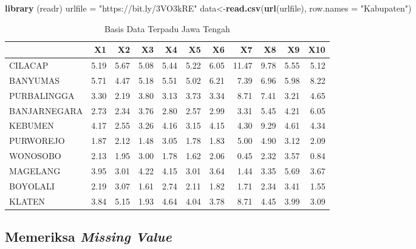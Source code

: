 \documentclass[
  oneside]{book}
\newenvironment{Shaded}{\begin{snugshade}}{\end{snugshade}}
\newcommand{\AttributeTok}[1]{\textcolor[rgb]{0.13,0.29,0.53}{#1}}
\newcommand{\FunctionTok}[1]{\textcolor[rgb]{0.13,0.29,0.53}{\textbf{#1}}}
\newcommand{\NormalTok}[1]{#1}
\newcommand{\OtherTok}[1]{\textcolor[rgb]{0.56,0.35,0.01}{#1}}
\newcommand{\StringTok}[1]{\textcolor[rgb]{0.31,0.60,0.02}{#1}}
\begin{document}
\begin{Shaded}
\begin{Highlighting}[]
\FunctionTok{library}\NormalTok{ (readr)}
\NormalTok{urlfile }\OtherTok{=} \StringTok{"https://bit.ly/3VO3kRE"}
\NormalTok{data}\OtherTok{\textless{}{-}}\FunctionTok{read.csv}\NormalTok{(}\FunctionTok{url}\NormalTok{(urlfile), }\AttributeTok{row.names =} \StringTok{"Kabupaten"}\NormalTok{)}
\end{Highlighting}
\end{Shaded}

\begin{table}

\caption{\label{tab:nice-tab-km}Basis Data Terpadu Jawa Tengah}
\centering
\begin{tabular}[t]{lrrrrrrrrrr}
\toprule
  & X1 & X2 & X3 & X4 & X5 & X6 & X7 & X8 & X9 & X10\\
\midrule
CILACAP & 5.19 & 5.67 & 5.08 & 5.44 & 5.22 & 6.05 & 11.47 & 9.78 & 5.55 & 5.12\\
BANYUMAS & 5.71 & 4.47 & 5.18 & 5.51 & 5.02 & 6.21 & 7.39 & 6.96 & 5.98 & 8.22\\
PURBALINGGA & 3.30 & 2.19 & 3.80 & 3.13 & 3.73 & 3.34 & 8.71 & 7.41 & 3.21 & 4.65\\
BANJARNEGARA & 2.73 & 2.34 & 3.76 & 2.80 & 2.57 & 2.99 & 3.31 & 5.45 & 4.21 & 6.05\\
KEBUMEN & 4.17 & 2.55 & 3.26 & 4.16 & 3.15 & 4.15 & 4.30 & 9.29 & 4.61 & 4.34\\
\addlinespace
PURWOREJO & 1.87 & 2.12 & 1.48 & 3.05 & 1.78 & 1.83 & 5.00 & 4.90 & 3.12 & 2.09\\
WONOSOBO & 2.13 & 1.95 & 3.00 & 1.78 & 1.62 & 2.06 & 0.45 & 2.32 & 3.57 & 0.84\\
MAGELANG & 3.95 & 3.01 & 4.22 & 4.15 & 3.01 & 3.64 & 1.44 & 3.35 & 5.69 & 3.67\\
BOYOLALI & 2.19 & 3.07 & 1.61 & 2.74 & 2.11 & 1.82 & 1.71 & 2.34 & 3.41 & 1.55\\
KLATEN & 3.84 & 5.15 & 1.93 & 4.64 & 4.04 & 3.78 & 8.71 & 4.45 & 3.99 & 3.09\\
\bottomrule
\end{tabular}
\end{table}

\subsection*{\texorpdfstring{Memeriksa \emph{Missing Value}}{Memeriksa Missing Value}}\label{memeriksa-missing-value}
\end{document}
